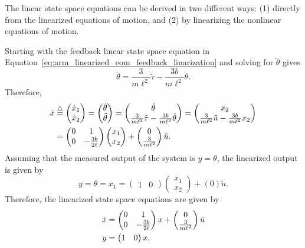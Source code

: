
The linear state space equations can be derived in two different ways: (1) directly from the linearized equations of motion, and (2) by linearizing the nonlinear equations of motion.

Starting with the feedback linear state space equation in Equation~\eqref{eq:arm_linearized_eom_feedback_linarization} and solving for $\ddot{\theta}$ gives
\[
\ddot{\theta} = \frac{3}{m\ell^2}\tilde{\tau} - \frac{3b}{m\ell^2}\dot{\theta}.
\]
Therefore,
\begin{align*}
\dot{x} &\stackrel{\triangle}{=} \begin{pmatrix} \dot{x}_1 \\ \dot{x}_2 \end{pmatrix} 
= \begin{pmatrix}\dot{\theta} \\ \ddot{\theta}\end{pmatrix} 
= \begin{pmatrix} \dot{\theta} \\ \frac{3}{m\ell^2}\tilde{\tau} - \frac{3b}{m\ell^2}\dot{\theta}  \end{pmatrix}
=\begin{pmatrix} x_2 \\ \frac{3}{m\ell^2}\tilde{u} - \frac{3b}{m\ell^2}x_2  \end{pmatrix} \\
&= \begin{pmatrix} 0 & 1 \\ 0 & -\frac{3b}{2\ell} \end{pmatrix} \begin{pmatrix} x_1 \\ x_2 \end{pmatrix} + \begin{pmatrix} 0 \\ \frac{3}{m\ell^2} \end{pmatrix} \tilde{u}.
\end{align*}
Assuming that the measured output of the system is $y=\theta$, the linearized output is given by
\[
y = \theta = x_1 = \begin{pmatrix} 1 & 0\end{pmatrix}\begin{pmatrix}x_1 \\ x_2 \end{pmatrix} + (0)\tilde{u}.
\]
Therefore, the linearized state space equations are given by
\begin{align}
\dot{x} &= \begin{pmatrix} 0 & 1 \\ 0 & -\frac{3b}{2\ell} \end{pmatrix} x + \begin{pmatrix} 0 \\ \frac{3}{m\ell^2} \end{pmatrix} \tilde{u} 
\notag \\
y &= \begin{pmatrix} 1 & 0\end{pmatrix} x.
\label{eq:dm_arm_linearized_ss}
\end{align}

